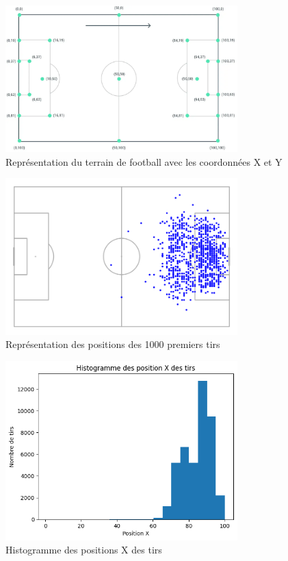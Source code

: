 \documentclass[12pt]{article}
\begin{document}
\begin{figure}[htp]
    \centering
    \includegraphics[width=0.8\textwidth]{img/CoordTerrain.png}
    \caption{Représentation du terrain de football avec les coordonnées X et Y}
    \label{fig:terrain}
\end{figure}

\begin{figure}[htp]
    \centering
    \includegraphics[width=0.8\textwidth]{img/PositionTirsDatasetEvent.png}
    \caption{Représentation des positions des 1000 premiers tirs}
    \label{fig:events_tirs_emplacements}
\end{figure}

\begin{figure}
    \centering
    \includegraphics[width=0.8\textwidth]{img/histogramme_position_x_tirs.png}
    \caption{Histogramme des positions X des tirs}
    \label{fig:histogramme_position_x_tirs}
\end{figure}
\end{document}
